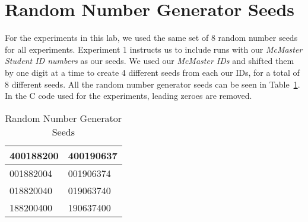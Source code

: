 \section*{Random Number Generator Seeds}
For the experiments in this lab, we used the same set of 8 random number seeds for all experiments. Experiment 1 instructs us to include runs with our \textit{McMaster Student ID numbers} as our seeds. We used our \textit{McMaster IDs} and shifted them by one digit at a time to create 4 different seeds from each our IDs, for a total of 8 different seeds. All the random number generator seeds can be seen in Table~\ref{tab:random_seeds}. In the C code used for the experiments, leading zeroes are removed.

\begin{table}[h]
\caption{Random Number Generator Seeds}
\label{tab:random_seeds}
\centering
\begin{tabular}{|l|l|}
	\hline
	400188200 & 400190637 \\ \hline
	001882004 & 001906374 \\ \hline
	018820040 & 019063740 \\ \hline
	188200400 & 190637400 \\ \hline
\end{tabular}
\end{table}